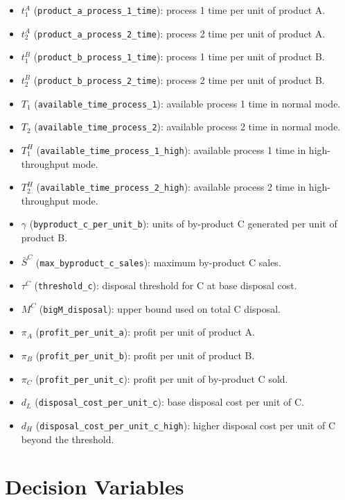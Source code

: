 \begin{itemize}
    \item $t^{A}_{1}$ (\texttt{product\_a\_process\_1\_time}): process 1 time per unit of product A.
    \item $t^{A}_{2}$ (\texttt{product\_a\_process\_2\_time}): process 2 time per unit of product A.
    \item $t^{B}_{1}$ (\texttt{product\_b\_process\_1\_time}): process 1 time per unit of product B.
    \item $t^{B}_{2}$ (\texttt{product\_b\_process\_2\_time}): process 2 time per unit of product B.
    \item $T_{1}$ (\texttt{available\_time\_process\_1}): available process 1 time in normal mode.
    \item $T_{2}$ (\texttt{available\_time\_process\_2}): available process 2 time in normal mode.
    \item $T^{H}_{1}$ (\texttt{available\_time\_process\_1\_high}): available process 1 time in high-throughput mode.
    \item $T^{H}_{2}$ (\texttt{available\_time\_process\_2\_high}): available process 2 time in high-throughput mode.
    \item $\gamma$ (\texttt{byproduct\_c\_per\_unit\_b}): units of by-product C generated per unit of product B.
    \item $\bar S^{C}$ (\texttt{max\_byproduct\_c\_sales}): maximum by-product C sales.
    \item $\tau^{C}$ (\texttt{threshold\_c}): disposal threshold for C at base disposal cost.
    \item $M^{C}$ (\texttt{bigM\_disposal}): upper bound used on total C disposal.
    \item $\pi_A$ (\texttt{profit\_per\_unit\_a}): profit per unit of product A.
    \item $\pi_B$ (\texttt{profit\_per\_unit\_b}): profit per unit of product B.
    \item $\pi_C$ (\texttt{profit\_per\_unit\_c}): profit per unit of by-product C sold.
    \item $d_L$ (\texttt{disposal\_cost\_per\_unit\_c}): base disposal cost per unit of C.
    \item $d_H$ (\texttt{disposal\_cost\_per\_unit\_c\_high}): higher disposal cost per unit of C beyond the threshold.
\end{itemize}

\section*{Decision Variables}

